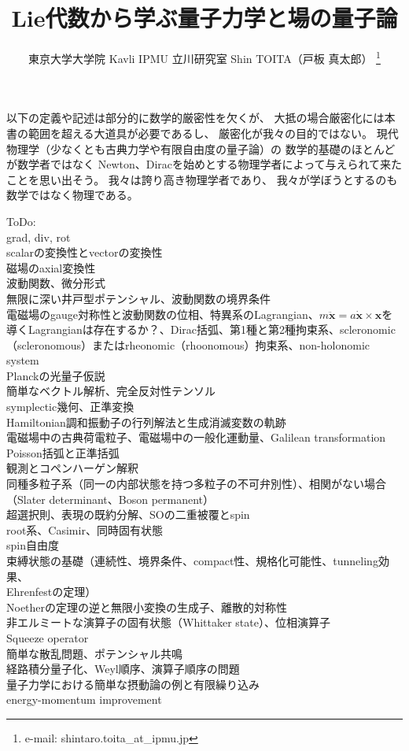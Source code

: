 \documentclass[dvipdfmx, uplatex]{jsarticle}
\title{Lie代数から学ぶ量子力学と場の量子論}
\author{東京大学大学院 Kavli IPMU 立川研究室 \hspace{15pt}Shin TOITA（戸板 真太郎）
\thanks{e-mail: shintaro.toita\_at\_ipmu.jp}}
\begin{document}
\maketitle
\vspace{-4zh}

\tableofcontents
\newpage

以下の定義や記述は部分的に数学的厳密性を欠くが、
大抵の場合厳密化には本書の範囲を超える大道具が必要であるし、
厳密化が我々の目的ではない。
現代物理学（少なくとも古典力学や有限自由度の量子論）の
数学的基礎のほとんどが数学者ではなく
Newton、Diracを始めとする物理学者によって与えられて来たことを思い出そう。
我々は誇り高き物理学者であり、
我々が学ぼうとするのも数学ではなく物理である。

ToDo:
\\grad, div, rot
\\scalarの変換性とvectorの変換性
\\磁場のaxial変換性
\\波動関数、微分形式
\\無限に深い井戸型ポテンシャル、波動関数の境界条件
\\電磁場のgauge対称性と波動関数の位相、特異系のLagrangian、$m\ddot{\bm{x}} = a\dot{\bm{x}}\times\bm{x}$を導くLagrangianは存在するか？、Dirac括弧、第1種と第2種拘束系、scleronomic（scleronomous）またはrheonomic（rhoonomous）拘束系、non-holonomic system
\\Planckの光量子仮説 
\\簡単なベクトル解析、完全反対性テンソル
\\symplectic幾何、正準変換
\\Hamiltonian調和振動子の行列解法と生成消滅変数の軌跡
\\電磁場中の古典荷電粒子、電磁場中の一般化運動量、Galilean transformation 
\\Poisson括弧と正準括弧
\\観測とコペンハーゲン解釈
\\同種多粒子系（同一の内部状態を持つ多粒子の不可弁別性）、相関がない場合（Slater determinant、Boson permanent）
\\超選択則、表現の既約分解、SOの二重被覆とspin
\\root系、Casimir、同時固有状態
\\spin自由度
\\束縛状態の基礎（連続性、境界条件、compact性、規格化可能性、tunneling効果、
\\Ehrenfestの定理）
\\Noetherの定理の逆と無限小変換の生成子、離散的対称性
\\非エルミートな演算子の固有状態（Whittaker state）、位相演算子
\\Squeeze operator
\\簡単な散乱問題、ポテンシャル共鳴
\\経路積分量子化、Weyl順序、演算子順序の問題
\\量子力学における簡単な摂動論の例と有限繰り込み
\\energy-momentum improvement
\end{document}
